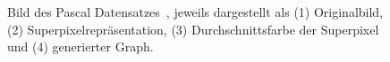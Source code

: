 \begin{figure}[t]
\centering
{}
  \caption[\gls{Pascal}]{Bild des \gls{Pascal} Datensatzes~\cite{pascal_voc}, jeweils dargestellt als (1) Originalbild, (2) Superpixelrepräsentation, (3) Durchschnittsfarbe der Superpixel und (4) generierter Graph.}
\label{fig:pascal_voc}
\end{figure}
